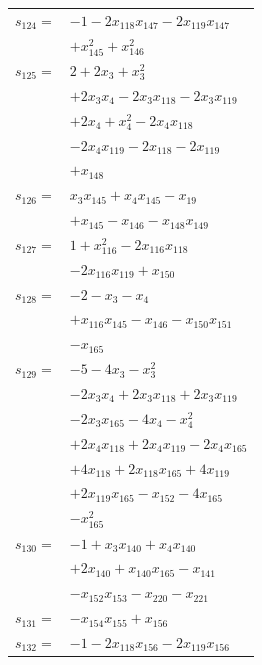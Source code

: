 \begin{longtable}{@{}r@{\;}l@{}}
\(s_{124}=\) & \(\displaystyle -1 -2x_{118}x_{147} -2x_{119}x_{147}\) \\
 & \(\displaystyle +x_{145}^{2} +x_{146}^{2}\) \\[3pt]
\(s_{125}=\) & \(\displaystyle 2 +2x_{3} +x_{3}^{2}\) \\
 & \(\displaystyle +2x_{3}x_{4} -2x_{3}x_{118} -2x_{3}x_{119}\) \\
 & \(\displaystyle +2x_{4} +x_{4}^{2} -2x_{4}x_{118}\) \\
 & \(\displaystyle -2x_{4}x_{119} -2x_{118} -2x_{119}\) \\
 & \(\displaystyle +x_{148}\) \\[3pt]
\(s_{126}=\) & \(\displaystyle x_{3}x_{145} +x_{4}x_{145} -x_{19}\) \\
 & \(\displaystyle +x_{145} -x_{146} -x_{148}x_{149}\) \\[3pt]
\(s_{127}=\) & \(\displaystyle 1 +x_{116}^{2} -2x_{116}x_{118}\) \\
 & \(\displaystyle -2x_{116}x_{119} +x_{150}\) \\[3pt]
\(s_{128}=\) & \(\displaystyle -2 -x_{3} -x_{4}\) \\
 & \(\displaystyle +x_{116}x_{145} -x_{146} -x_{150}x_{151}\) \\
 & \(\displaystyle -x_{165}\) \\[3pt]
\(s_{129}=\) & \(\displaystyle -5 -4x_{3} -x_{3}^{2}\) \\
 & \(\displaystyle -2x_{3}x_{4} +2x_{3}x_{118} +2x_{3}x_{119}\) \\
 & \(\displaystyle -2x_{3}x_{165} -4x_{4} -x_{4}^{2}\) \\
 & \(\displaystyle +2x_{4}x_{118} +2x_{4}x_{119} -2x_{4}x_{165}\) \\
 & \(\displaystyle +4x_{118} +2x_{118}x_{165} +4x_{119}\) \\
 & \(\displaystyle +2x_{119}x_{165} -x_{152} -4x_{165}\) \\
 & \(\displaystyle -x_{165}^{2}\) \\[3pt]
\(s_{130}=\) & \(\displaystyle -1 +x_{3}x_{140} +x_{4}x_{140}\) \\
 & \(\displaystyle +2x_{140} +x_{140}x_{165} -x_{141}\) \\
 & \(\displaystyle -x_{152}x_{153} -x_{220} -x_{221}\) \\[3pt]
\(s_{131}=\) & \(\displaystyle -x_{154}x_{155} +x_{156}\) \\[3pt]
\(s_{132}=\) & \(\displaystyle -1 -2x_{118}x_{156} -2x_{119}x_{156}\) \\

\end{longtable}

